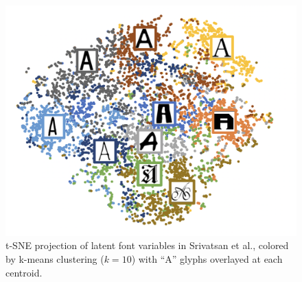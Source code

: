 \begin{figure}[htbp]
    \centering
    \includegraphics[width=.8\textwidth]{images/srivatsan-latent.png}
    \caption{t-SNE projection of latent font variables in Srivatsan et al., colored by k-means clustering ($k=10$) with ``A'' glyphs overlayed at each centroid.}
    \label{fig:srivatsan-latent}
\end{figure}
